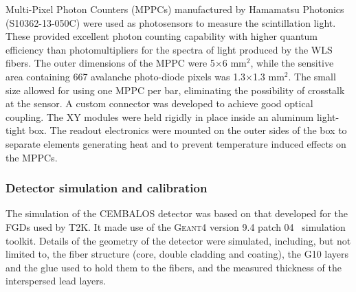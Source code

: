Multi-Pixel Photon Counters (MPPCs) manufactured by Hamamatsu Photonics (S10362-13-050C) were used as photosensors to measure the scintillation light. These provided excellent photon counting capability with higher quantum efficiency than photomultipliers for the spectra of light produced by the WLS fibers. The outer dimensions of the MPPC were 5$\times$6 mm$^2$, while the sensitive area containing 667 avalanche photo-diode pixels was 1.3$\times$1.3 mm$^2$. The small size allowed for using one MPPC per bar, eliminating the possibility of crosstalk at the sensor. A custom connector was developed to achieve good optical coupling.
The XY modules were held rigidly in place inside an aluminum light-tight box. The readout electronics were mounted on the outer sides of the box to separate elements generating heat and to prevent temperature induced effects on the MPPCs. 


\subsubsection{\bf Detector simulation and calibration}\label{section:calibration}
The simulation of the CEMBALOS detector was based on that developed for the FGDs used by T2K. It made use of the \textsc{Geant4} version 9.4 patch 04~\cite{geant} simulation toolkit. Details of the geometry of the detector were simulated, including, but not limited to, the fiber structure (core, double cladding and coating), the G10 layers and the glue used to hold them to the fibers, and the measured thickness of the interspersed lead layers.

